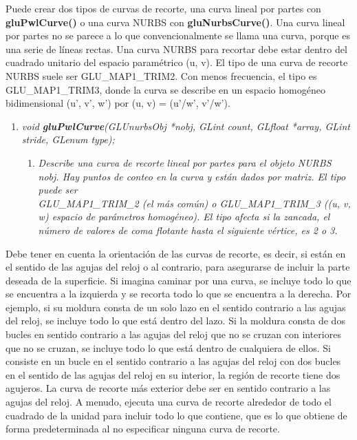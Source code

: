 Puede crear dos tipos de curvas de recorte, una curva lineal por partes con
\textbf{gluPwlCurve()} o una curva NURBS con \textbf{gluNurbsCurve()}.
Una curva lineal por partes no se parece a lo que convencionalmente
se llama una curva, porque es una serie de líneas rectas. Una curva
NURBS para recortar debe estar dentro del cuadrado unitario del espacio
paramétrico (u, v). El tipo de una curva de recorte NURBS suele ser
GLU\_MAP1\_TRIM2. Con menos frecuencia, el tipo es GLU\_MAP1\_TRIM3,
donde la curva se describe en un espacio homogéneo bidimensional
(u', v', w') por (u, v) = (u'/w', v'/w').

\begin{enumerate}
    \item \emph{void \textbf{gluPwlCurve}(GLUnurbsObj *nobj, GLint count, GLfloat *array,
    GLint stride, GLenum type);}
    \begin{enumerate}
        \item[] \textit{Describe una curva de recorte lineal por partes para
            el objeto NURBS nobj. Hay puntos de conteo en la curva y
            están dados por matriz. El tipo puede ser\\GLU\_MAP1\_TRIM\_2
            (el más común) o GLU\_MAP1\_TRIM\_3 ((u, v, w) espacio de
            parámetros homogéneo). El tipo afecta si la zancada, el número
            de valores de coma flotante hasta el siguiente vértice, es 2 o 3.
        }
    \end{enumerate}
\end{enumerate}

Debe tener en cuenta la orientación de las curvas de recorte, es decir,
si están en el sentido de las agujas del reloj o al contrario,
para asegurarse de incluir la parte deseada de la superficie.
Si imagina caminar por una curva, se incluye todo lo que se encuentra
a la izquierda y se recorta todo lo que se encuentra a la derecha.
Por ejemplo, si su moldura consta de un solo lazo en el sentido contrario
a las agujas del reloj, se incluye todo lo que está dentro del lazo.
Si la moldura consta de dos bucles en sentido contrario a las agujas del
reloj que no se cruzan con interiores que no se cruzan, se incluye todo
lo que está dentro de cualquiera de ellos. Si consiste en un bucle en el
sentido contrario a las agujas del reloj con dos bucles en el sentido
de las agujas del reloj en su interior, la región de recorte tiene dos
agujeros. La curva de recorte más exterior debe ser en sentido contrario
a las agujas del reloj. A menudo, ejecuta una curva de recorte alrededor
de todo el cuadrado de la unidad para incluir todo lo que contiene, que
es lo que obtiene de forma predeterminada al no especificar ninguna curva de recorte.

